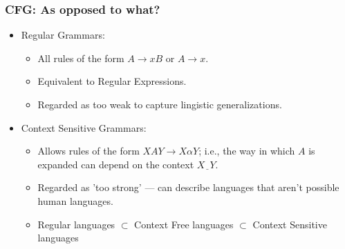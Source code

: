 \begin{frame}[fragile]
\frametitle{CFG: As opposed to what?}

\begin{itemize}
\item Regular Grammars:
  \begin{itemize}
  \item All rules of the form $A \rightarrow x B$ or $A \rightarrow x$.
  \item Equivalent to Regular Expressions.
  \item Regarded as too weak to capture lingistic
    generalizations.
  \end{itemize}
  
\item Context Sensitive Grammars:
  \begin{itemize}
  \item Allows rules of the form $X A Y \rightarrow X \alpha Y$; i.e.,
        the way in which $A$ is expanded can depend on the context $X
        \underline{\,\,\,} Y$.
  \item Regarded as 'too strong' --- can describe languages that aren't possible human languages.
  \item Regular languages $\subset$ Context Free languages  $\subset$
        Context Sensitive languages
  \end{itemize}
  
\end{itemize}



\end{frame}

%



